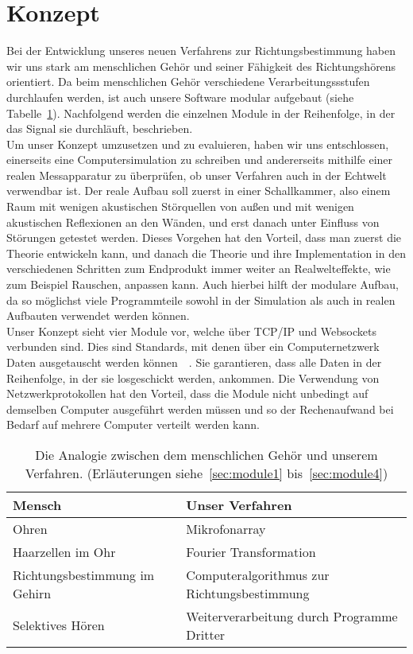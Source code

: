 \section{Konzept}
Bei der Entwicklung unseres neuen Verfahrens zur Richtungsbestimmung haben wir uns stark am menschlichen Gehör und seiner Fähigkeit des Richtungshörens orientiert. Da beim menschlichen Gehör verschiedene Verarbeitungssstufen durchlaufen werden, ist auch unsere Software modular aufgebaut (siehe Tabelle~\ref{analog}). Nachfolgend werden die einzelnen Module in der Reihenfolge, in der das Signal sie durchläuft, beschrieben.\\
Um unser Konzept umzusetzen und zu evaluieren, haben wir uns entschlossen, einerseits eine Computersimulation zu schreiben und andererseits mithilfe einer realen Messapparatur zu überprüfen, ob unser Verfahren auch in der Echtwelt verwendbar ist. Der reale Aufbau soll zuerst in einer Schallkammer, also einem Raum mit wenigen akustischen Störquellen von außen und mit wenigen akustischen Reflexionen an den Wänden, und erst danach unter Einfluss von Störungen getestet werden. Dieses Vorgehen hat den Vorteil, dass man zuerst die Theorie entwickeln kann, und danach die Theorie und ihre Implementation in den verschiedenen Schritten zum Endprodukt immer weiter an Realwelteffekte, wie zum Beispiel Rauschen, anpassen kann. Auch hierbei hilft der modulare Aufbau, da so möglichst viele Programmteile sowohl in der Simulation als auch in realen Aufbauten verwendet werden können.\\
Unser Konzept sieht vier Module vor, welche über TCP/IP und Websockets verbunden sind. Dies sind Standards, mit denen über ein Computernetzwerk Daten ausgetauscht werden können~\cite{tcp}~\cite{websockets}. Sie garantieren, dass alle Daten in der Reihenfolge, in der sie losgeschickt werden, ankommen. Die Verwendung von Netzwerkprotokollen hat den Vorteil, dass die Module nicht unbedingt auf demselben Computer ausgeführt werden müssen und so der Rechenaufwand bei Bedarf auf mehrere Computer verteilt werden kann.
\begin{table}[h]
	\centering
	\begin{tabular}{ll}
      Mensch            & Unser Verfahren                                   \\ \midrule
      Ohren             & Mikrofonarray                              \\
      Haarzellen im Ohr & Fourier Transformation                     \\
      Richtungsbestimmung im Gehirn            & Computeralgorithmus zur Richtungsbestimmung                       \\
      Selektives Hören  & Weiterverarbeitung durch Programme Dritter
	\end{tabular}
    \caption{Die Analogie zwischen dem menschlichen Gehör und unserem Verfahren. (Erläuterungen siehe~\ref{sec:module1} bis~\ref{sec:module4})\label{analog}}
\end{table}

